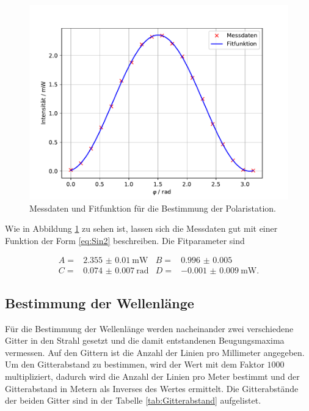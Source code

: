 \FloatBarrier
\begin{figure}
  \centering
  \includegraphics[width= \textwidth, keepaspectratio]{figure/Polarisation.pdf}
  \caption{Messdaten und Fitfunktion für die Bestimmung der Polaristation.}
  \label{fig:Polarisation}
\end{figure}
\FloatBarrier

Wie in Abbildung \ref{fig:Polarisation} zu sehen ist, lassen sich die Messdaten gut mit einer Funktion der Form \eqref{eq:Sin2}
beschreiben.
Die Fitparameter sind 

\begin{align*}
  A=&\SI{2.355(10)}{\milli\watt} &B=&\num{0.996(5)}\\
  C=&\SI{0.074(7)}{\radian} &D=&\SI{-0.001(9)}{\milli\watt}.
\end{align*}

\subsection{Bestimmung der Wellenlänge}

Für die Bestimmung der Wellenlänge werden nacheinander zwei verschiedene Gitter in den Strahl gesetzt und die damit entstandenen 
Beugungsmaxima vermessen.
Auf den Gittern ist die Anzahl der Linien pro Millimeter angegeben. Um den Gitterabstand zu bestimmen, wird der Wert mit dem 
Faktor $\num{1000}$ multipliziert, dadurch wird die Anzahl der Linien pro Meter bestimmt und der Gitterabstand in Metern als
Inverses des Wertes ermittelt.
Die Gitterabstände der beiden Gitter sind in der Tabelle \ref{tab:Gitterabstand} aufgelistet.

